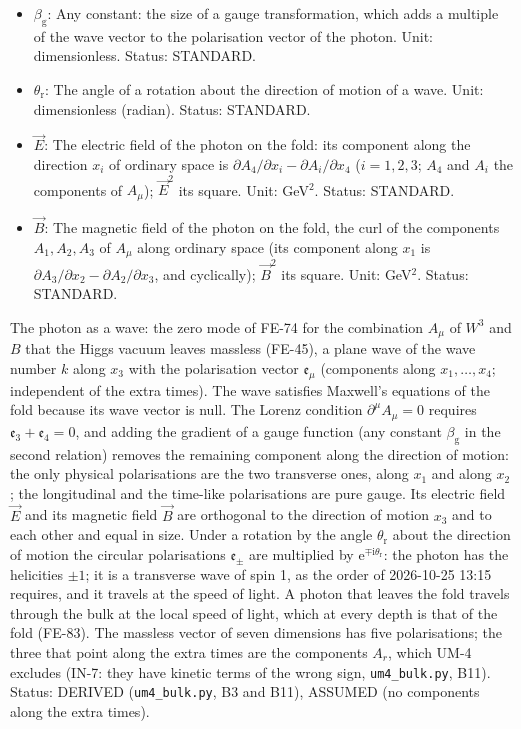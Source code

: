 \documentclass[
  10pt,
]{article}
\begin{document}
\begin{itemize}
  Status: AUTHOR.
\item
  \(\beta_{\mathrm{g}}\): Any constant: the size of a gauge
  transformation, which adds a multiple of the wave vector to the
  polarisation vector of the photon. Unit: dimensionless. Status:
  STANDARD.
\item
  \(\theta_{\mathrm{r}}\): The angle of a rotation about the direction
  of motion of a wave. Unit: dimensionless (radian). Status: STANDARD.
\item
  \(\vec E\): The electric field of the photon on the fold: its
  component along the direction \(x_i\) of ordinary space is
  \(\partial A_4/\partial x_i - \partial A_i/\partial x_4\)
  (\(i = 1, 2, 3\); \(A_4\) and \(A_i\) the components of \(A_\mu\));
  \(\vec E^2\) its square. Unit: GeV\(^2\). Status: STANDARD.
\item
  \(\vec B\): The magnetic field of the photon on the fold, the curl of
  the components \(A_1, A_2, A_3\) of \(A_\mu\) along ordinary space
  (its component along \(x_1\) is
  \(\partial A_3/\partial x_2 - \partial A_2/\partial x_3\), and
  cyclically); \(\vec B^2\) its square. Unit: GeV\(^2\). Status:
  STANDARD.
\end{itemize}

The photon as a wave: the zero mode of FE-74 for the combination
\(A_\mu\) of \(W^3\) and \(B\) that the Higgs vacuum leaves massless
(FE-45), a plane wave of the wave number \(k\) along \(x_3\) with the
polarisation vector \(\mathfrak{e}_\mu\) (components along
\(x_1, \dots, x_4\); independent of the extra times). The wave satisfies
Maxwell's equations of the fold because its wave vector is null. The
Lorenz condition \(\partial^\mu A_\mu = 0\) requires
\(\mathfrak{e}_3 + \mathfrak{e}_4 = 0\), and adding the gradient of a
gauge function (any constant \(\beta_{\mathrm{g}}\) in the second
relation) removes the remaining component along the direction of motion:
the only physical polarisations are the two transverse ones, along
\(x_1\) and along \(x_2\); the longitudinal and the time-like
polarisations are pure gauge. Its electric field \(\vec E\) and its
magnetic field \(\vec B\) are orthogonal to the direction of motion
\(x_3\) and to each other and equal in size. Under a rotation by the
angle \(\theta_{\mathrm{r}}\) about the direction of motion the circular
polarisations \(\mathfrak{e}_\pm\) are multiplied by
\(\mathrm{e}^{\mp\mathrm{i}\theta_{\mathrm{r}}}\): the photon has the
helicities \(\pm1\); it is a transverse wave of spin 1, as the order of
2026-10-25 13:15 requires, and it travels at the speed of light. A
photon that leaves the fold travels through the bulk at the local speed
of light, which at every depth is that of the fold (FE-83). The massless
vector of seven dimensions has five polarisations; the three that point
along the extra times are the components \(A_r\), which UM-4 excludes
(IN-7: they have kinetic terms of the wrong sign, \texttt{um4\_bulk.py},
B11). Status: DERIVED (\texttt{um4\_bulk.py}, B3 and B11), ASSUMED (no
components along the extra times).
\end{document}
